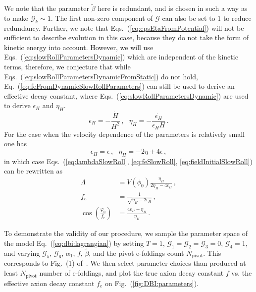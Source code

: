 \documentclass[12pt]{article}
\begin{document}
We note that the parameter $\tilde\beta$ here is redundant, and is chosen in such a way as to make $\mathcal{G}_k \sim 1$.
The first non-zero component of $\mathcal{G}$ can also be set to $1$ to reduce redundancy.
Further, we note that Eqs.~(\ref{eq:epsEtaFromPotential}) will not be sufficient to describe evolution in this case, because they do not take the form of kinetic energy into account.
However, we will use Eqs.~(\ref{eq:slowRollParametersDynamic}) which are independent of the kinetic terms, therefore, we conjecture that while Eqs.~(\ref{eq:slowRollParametersDynamicFromStatic}) do not hold, Eq.~(\ref{eq:feFromDynamicSlowRollParameters}) can still be used to derive an effective decay constant, where Eqs.~(\ref{eq:slowRollParametersDynamic}) are used to derive $\epsilon_H$ and $\eta_H$.
\begin{equation} \label{eq:slowRollParametersDynamic}
  \epsilon_H = -\frac{\dot H}{H^2}\,,
  ~~~ \eta_H = -\frac{\dot{\epsilon_H}}{\epsilon_H H}\,.
\end{equation}
For the case when the velocity dependence of the parameters is relatively small one has
\begin{equation} \label{eq:slowRollParametersDynamicFromStatic}
  \epsilon_H = \epsilon\,,
  ~~~ \eta_H = -2 \eta + 4 \epsilon\,,
\end{equation}
in which case Eqs.~(\ref{eq:lambdaSlowRoll}, \ref{eq:feSlowRoll}, \ref{eq:fieldInitialSlowRoll}) can be rewritten as
\begin{align} %
  \Lambda &= V\left(\phi_0\right) \frac{\eta_H}{2 \eta_H - 4 \epsilon_H}\,,\\
  \label{eq:feFromDynamicSlowRollParameters}
  f_e &= \frac{1}{\sqrt{\eta_H - 2 \epsilon_H}}\,,\\
  \cos\left(\frac{\varphi_0}{f_e}\right) &= \frac{4 \epsilon_H - \eta_H}{\eta_H}\,.
\end{align}

To demonstrate the validity of our procedure, we sample the parameter space of the model Eq.~(\ref{eq:dbi:lagrangian}) by setting $T = 1$, $\mathcal{G}_1 = \mathcal{G}_2 = \mathcal{G}_3 = 0$, $\mathcal{G}_4 = 1$, and varying $\mathcal{G}_5$, $\mathcal{G}_6$, $\alpha_1$, $f$, $\tilde\beta$, and the pivot e-foldings count $N_\text{pivot}$.
This corresponds to Fig.~(1) of~\cite{Nath:2018xxe}.
We then select parameter choices than produced at least $N_\text{pivot}$ number of e-foldings, and plot the true axion decay constant $f$ vs. the effective axion decay constant $f_e$ on Fig.~(\ref{fig:DBI:parameters}).
\end{document}
